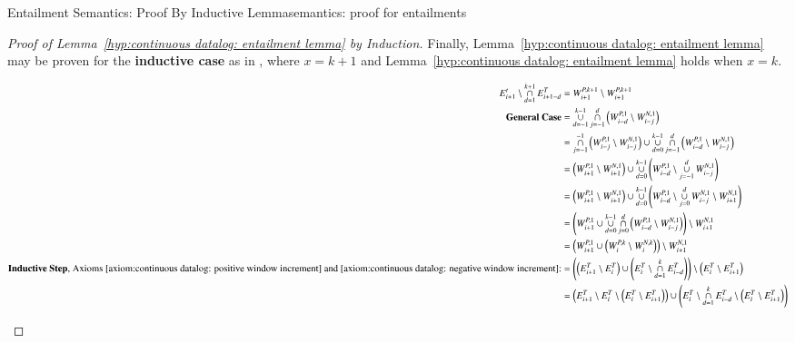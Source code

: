 \begin{nestedsection}{Entailment Semantics: Proof By Inductive Lemma}{semantics: proof for entailments}
\begin{proof}[Proof of Lemma~\ref{hyp:continuous datalog: entailment lemma} by Induction]
		Finally, Lemma~\ref{hyp:continuous datalog: entailment lemma} may be proven for the \textbf{inductive case} as in , where ${x = k + 1}$ and Lemma~\ref{hyp:continuous datalog: entailment lemma} holds when ${x = k}$.
		\begin{figure*}[p]
			\centering
			\caption[Proof of Entailment Lemma for Continuous Datalog]{Proof of Inductive Case of the Entailment Lemma for Continuous Datalog.}
			\begin{align*}
				E^t_{i+1} \setminus \mathop{\cap}^{k+1}_{d=1} E^T_{i+1-d} & = W^{P,k+1}_{i+1} \setminus W^{P,k+1}_{i+1} \\
				\text{\textbf{General Case}} & = \mathop{\cup}^{k-1}_{d=-1}\mathop{\cap}^{d}_{j=-1} \left( W^{P,1}_{i-d} \setminus W^{N,1}_{i-j} \right) \\
				& = \mathop{\cap}^{-1}_{j=-1} \left( W^{P,1}_{i-j} \setminus W^{N,1}_{i-j} \right) \cup \mathop{\cup}^{k-1}_{d=0}\mathop{\cap}^{d}_{j=-1} \left( W^{P,1}_{i-d} \setminus W^{N,1}_{i-j} \right) \\
				& = \left( W^{P,1}_{i+1} \setminus W^{N,1}_{i+1} \right) \cup \mathop{\cup}^{k-1}_{d=0} \left( W^{P,1}_{i-d} \setminus \mathop{\cup}^{d}_{j=-1} W^{N,1}_{i-j} \right) \\
				& = \left( W^{P,1}_{i+1} \setminus W^{N,1}_{i+1} \right) \cup \mathop{\cup}^{k-1}_{d=0} \left( W^{P,1}_{i-d} \setminus \mathop{\cup}^{d}_{j=0} W^{N,1}_{i-j} \setminus W^{N,1}_{i+1} \right) \\
				& = \left( W^{P,1}_{i+1} \cup \mathop{\cup}^{k-1}_{d=0}\mathop{\cap}^{d}_{j=0} \left( W^{P,1}_{i-d} \setminus W^{N,1}_{i-j} \right) \right) \setminus W^{N,1}_{i+1} \\
				& = \left( W^{P,1}_{i+1} \cup \left( W^{P,k}_{i} \setminus W^{N,k}_{i} \right) \right) \setminus W^{N,1}_{i+1} \\
				\text{\textbf{Inductive Step}, Axioms~\ref{axiom:continuous datalog: positive window increment}~and~\ref{axiom:continuous datalog: negative window increment}:}& = \left( \left( E^T_{i+1} \setminus E^T_{i} \right) \cup \left( E^T_{i} \setminus \mathop{\cap}^{k}_{d=1} E^T_{i-d} \right) \right) \setminus \left( E^T_{i} \setminus E^T_{i+1} \right) \\
				& = \left( E^T_{i+1} \setminus E^T_{i} \setminus \left( E^T_{i} \setminus E^T_{i+1} \right) \right) \cup \left( E^T_{i} \setminus \mathop{\cap}^{k}_{d=1} E^T_{i-d} \setminus \left( E^T_{i} \setminus E^T_{i+1} \right) \right) \\

\end{align*}
\end{figure*}
\end{proof}
\end{nestedsection}
